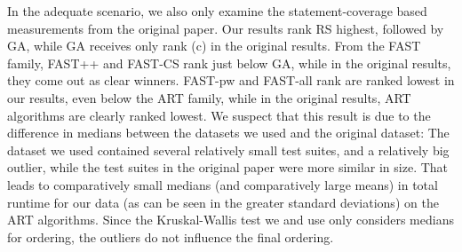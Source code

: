 In the adequate scenario, we also only examine the statement-coverage
based measurements from the original paper. Our results rank RS highest,
followed by GA, while GA receives only rank (c) in the original results.
From the FAST family, FAST++ and FAST-CS rank just below GA, while
in the original results, they come out as clear winners. FAST-pw and
FAST-all rank are ranked lowest in our results, even below the ART family,
while in the original results, ART algorithms are clearly ranked lowest.
We suspect that this result is due to the difference in medians between
the datasets we used and the original dataset: The dataset we used
contained several relatively small test suites, and a relatively big
outlier, while the test suites in the original paper were more similar
in size. That leads to comparatively small medians (and comparatively
large means) in total runtime for our data (as can be seen in the greater
standard deviations) on the ART algorithms. Since the Kruskal-Wallis
test we and \cite{cruciani2019scalable} use only considers medians for
ordering, the outliers do not influence the final ordering.

